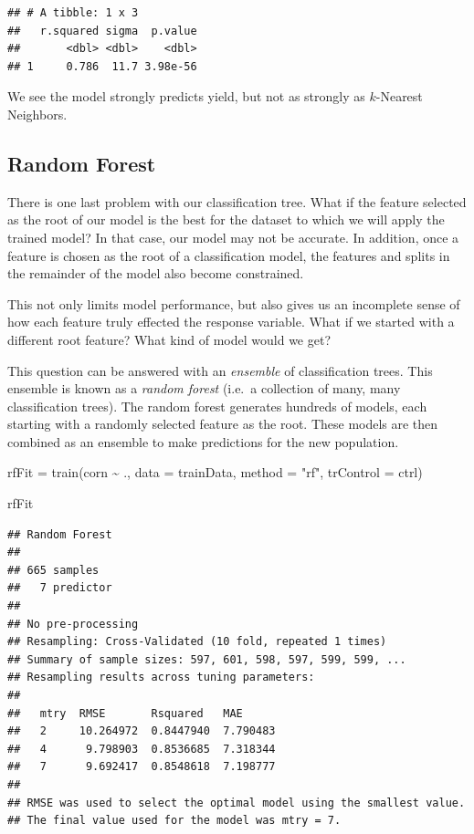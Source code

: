 \documentclass[
]{book}
\newenvironment{Shaded}{\begin{snugshade}}{\end{snugshade}}
\newcommand{\AttributeTok}[1]{\textcolor[rgb]{0.77,0.63,0.00}{#1}}
\newcommand{\FunctionTok}[1]{\textcolor[rgb]{0.00,0.00,0.00}{#1}}
\newcommand{\NormalTok}[1]{#1}
\newcommand{\OtherTok}[1]{\textcolor[rgb]{0.56,0.35,0.01}{#1}}
\newcommand{\SpecialCharTok}[1]{\textcolor[rgb]{0.00,0.00,0.00}{#1}}
\newcommand{\StringTok}[1]{\textcolor[rgb]{0.31,0.60,0.02}{#1}}
\begin{document}
\begin{verbatim}
## # A tibble: 1 x 3
##   r.squared sigma  p.value
##       <dbl> <dbl>    <dbl>
## 1     0.786  11.7 3.98e-56
\end{verbatim}

We see the model strongly predicts yield, but not as strongly as \(k\)-Nearest Neighbors.

\hypertarget{random-forest}{%
\subsection{Random Forest}\label{random-forest}}

There is one last problem with our classification tree. What if the feature selected as the root of our model is the best for the dataset to which we will apply the trained model? In that case, our model may not be accurate. In addition, once a feature is chosen as the root of a classification model, the features and splits in the remainder of the model also become constrained.

This not only limits model performance, but also gives us an incomplete sense of how each feature truly effected the response variable. What if we started with a different root feature? What kind of model would we get?

This question can be answered with an \emph{ensemble} of classification trees. This ensemble is known as a \emph{random forest} (i.e.~a collection of many, many classification trees). The random forest generates hundreds of models, each starting with a randomly selected feature as the root. These models are then combined as an ensemble to make predictions for the new population.

\begin{Shaded}
\begin{Highlighting}[]
\NormalTok{rfFit }\OtherTok{=} \FunctionTok{train}\NormalTok{(corn }\SpecialCharTok{\textasciitilde{}}\NormalTok{ .,}
                \AttributeTok{data =}\NormalTok{ trainData,}
                \AttributeTok{method =} \StringTok{"rf"}\NormalTok{,}
                \AttributeTok{trControl =}\NormalTok{ ctrl)}

\NormalTok{rfFit}
\end{Highlighting}
\end{Shaded}

\begin{verbatim}
## Random Forest 
## 
## 665 samples
##   7 predictor
## 
## No pre-processing
## Resampling: Cross-Validated (10 fold, repeated 1 times) 
## Summary of sample sizes: 597, 601, 598, 597, 599, 599, ... 
## Resampling results across tuning parameters:
## 
##   mtry  RMSE       Rsquared   MAE     
##   2     10.264972  0.8447940  7.790483
##   4      9.798903  0.8536685  7.318344
##   7      9.692417  0.8548618  7.198777
## 
## RMSE was used to select the optimal model using the smallest value.
## The final value used for the model was mtry = 7.
\end{verbatim}
\end{document}
